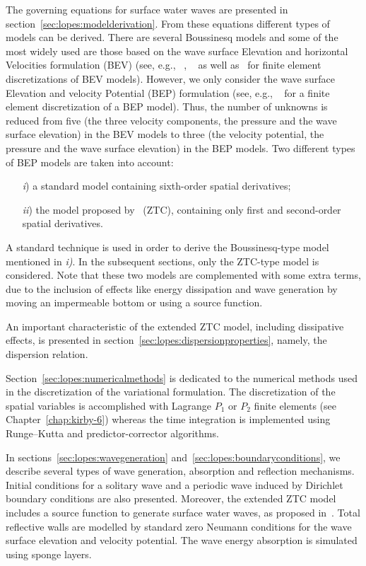 The governing equations for surface water waves are
presented in section~\ref{sec:lopes:modelderivation}. From
these equations different types of models can be derived.
There are several Boussinesq models and some of the most
widely used are those based on the wave surface Elevation
and horizontal Velocities formulation (BEV) (see, e.g.,
~\cite{WalkleyBerzins2002}, ~\cite{WooLiu2004a} as well
as~\cite{WooLiu2004b} for finite element discretizations of
BEV models).  However, we only consider the wave
surface Elevation and velocity Potential (BEP) formulation
(see, e.g., ~\cite{LangtangenPedersen1998} for a finite
element discretization of a BEP model).  Thus, the number of
unknowns is reduced from five (the three velocity
components, the pressure and the wave surface elevation) in
the BEV models to three (the velocity potential, the
pressure and the wave surface elevation) in the BEP models.
Two different types of BEP models are taken into account:
\begin{itemize}
\item[{\it i})] a standard  model containing sixth-order
  spatial derivatives;
\item[{\it ii})] the  model proposed
by~\cite{ZhaoTengCheng2004} (ZTC),
 containing only first and second-order spatial derivatives.
\end{itemize}
A standard technique is used in order to derive the
Boussinesq-type model mentioned in {\it i)}.  In the
subsequent sections, only the ZTC-type model is considered.
Note that these two models are complemented with some extra
terms, due to the inclusion of effects like energy
dissipation
and wave generation by moving
an impermeable bottom or using a source function.

An important characteristic of the extended ZTC model,
including dissipative effects, is presented in
section~\ref{sec:lopes:dispersionproperties}, namely, the
dispersion relation.

Section~\ref{sec:lopes:numericalmethods} is dedicated to the
numerical methods used in the discretization of the
variational formulation.  The discretization of the spatial
variables is accomplished with Lagrange $P_1$ or $P_2$
finite elements (see Chapter~\ref{chap:kirby-6}) whereas the
time integration is implemented using Runge--Kutta and
predictor-corrector algorithms.


In sections~\ref{sec:lopes:wavegeneration}
and~\ref{sec:lopes:boundaryconditions}, we describe several
types of wave generation, absorption and reflection
mechanisms.  Initial conditions for a solitary wave and a
periodic wave induced by Dirichlet boundary conditions are
also presented.  Moreover, the extended ZTC model includes a
source function to generate surface water waves, as proposed
in~\cite{WeiKirbySinha1999}.  Total reflective walls are
modelled by standard zero Neumann conditions for the wave
surface elevation and velocity potential.  The wave energy
absorption is simulated using sponge layers.

